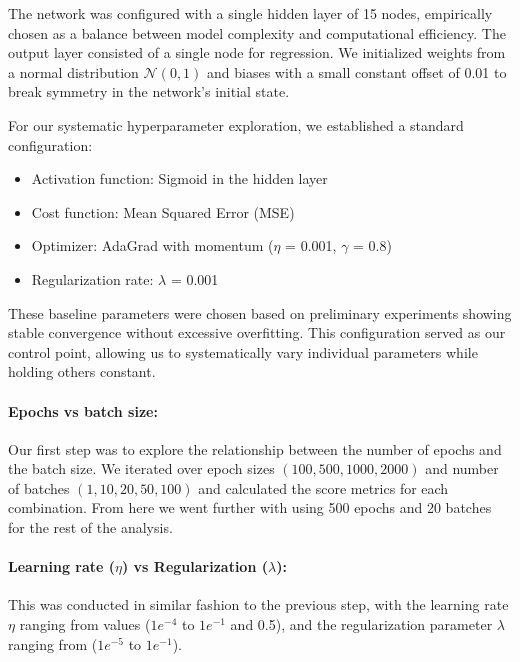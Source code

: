 The network was configured with a single hidden layer of 15 nodes, empirically chosen as a balance between model complexity and computational efficiency. The output layer consisted of a single node for regression. We initialized weights from a normal distribution \( \mathcal{N} (0,1) \) and biases with a small constant offset of 0.01 to break symmetry in the network's initial state.

For our systematic hyperparameter exploration, we established a standard configuration:
\begin{itemize}
    \item Activation function: Sigmoid in the hidden layer
    \item Cost function: Mean Squared Error (MSE)
    \item Optimizer: AdaGrad with momentum (\( \eta \) = 0.001, \( \gamma \) = 0.8)
    \item Regularization rate: \( \lambda \) = 0.001
\end{itemize}

These baseline parameters were chosen based on preliminary experiments showing stable convergence without excessive overfitting. This configuration served as our control point, allowing us to systematically vary individual parameters while holding others constant.

\paragraph*{Epochs vs batch size:}
Our first step was to explore the relationship between the number of epochs and the batch size. We iterated over epoch sizes \( (100, 500, 1000, 2000) \) and number of batches \( (1, 10, 20, 50, 100) \) and calculated the score metrics for each combination. From here we went further with using 500 epochs and 20 batches for the rest of the analysis.

\paragraph*{Learning rate (\( \eta \)) vs Regularization (\( \lambda \)):}
This was conducted in similar fashion to the previous step, with the learning rate \( \eta \) ranging from values (\( 1e^{-4} \) to \( 1e^{-1} \) and 0.5), and the regularization parameter \( \lambda \) ranging from (\( 1e^{-5} \) to \( 1e^{-1} \)).

